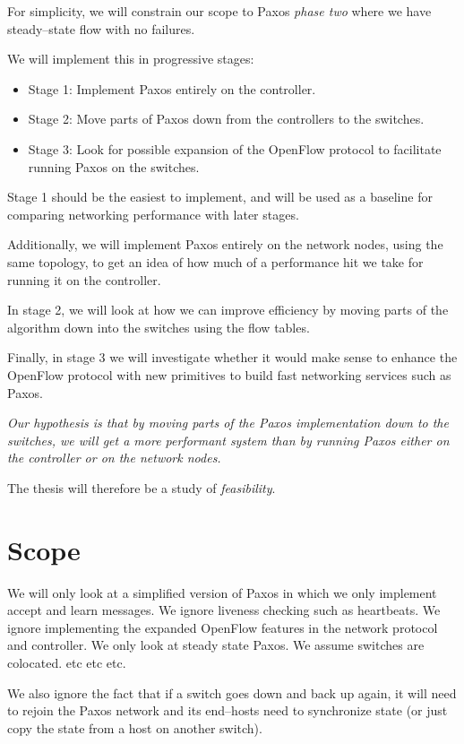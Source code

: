 For simplicity, we will constrain our scope to Paxos {\em phase two} where
we have steady--state flow with no failures.

We will implement this in progressive stages:

\begin{itemize}
\item Stage 1: Implement Paxos entirely on the controller.
\item Stage 2: Move parts of Paxos down from the controllers to the
switches.
\item Stage 3: Look for possible expansion of the OpenFlow protocol to
facilitate running Paxos on the switches.
\end{itemize}

Stage 1 should be the easiest to implement, and will be used as a baseline
for comparing networking performance with later stages.

Additionally, we will implement Paxos entirely on the network nodes, using
the same topology, to get an idea of how much of a performance hit we take
for running it on the controller.

In stage 2, we will look at how we can improve efficiency by moving parts of
the algorithm down into the switches using the flow tables.

Finally, in stage 3 we will investigate whether it would make sense to
enhance the OpenFlow protocol with new primitives to build fast
networking services such as Paxos.

{\em 
  Our hypothesis is that by moving parts of the Paxos implementation down to
  the switches, we will get a more performant system than by running Paxos
  either on the controller or on the network nodes.
}

The thesis will therefore be a study of {\em feasibility}.

\section{Scope}


We will only look at a simplified version of Paxos in which we only
implement accept and learn messages. We ignore liveness checking such as
heartbeats. We ignore implementing the expanded OpenFlow features in the
network protocol and controller. We only look at steady state Paxos.
We assume switches are colocated. etc etc etc.

We also ignore the fact that if a switch goes down and back up again, it
will need to rejoin the Paxos network and its end--hosts need to synchronize
state (or just copy the state from a host on another switch).

